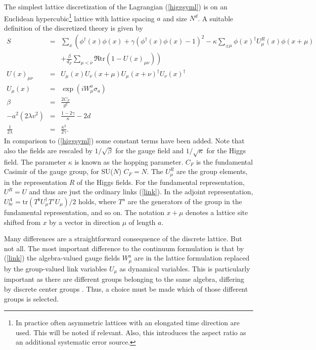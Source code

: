 \documentclass[final,twoside,12pt]{article}
\newcommand*{\no}{\noindent}
\newcommand*{\bea}{\begin{eqnarray}}
\newcommand*{\eea}{\end{eqnarray}}
\newcommand*{\pref}[1]{(\ref{#1})}
\newcommand*{\mn}{{\mu\nu}}
\newcommand*{\nn}{\nonumber}
\newcommand*{\tr}{\mathrm{tr}}
\newcommand*{\1}{1\!\!\!\bot}
\begin{document}
The simplest lattice discretization of the Lagrangian \pref{higgsyml} is on an Euclidean hypercubic\footnote{In practice often asymmetric lattices with an elongated time direction are used. This will be noted if relevant. Also, this introduces the aspect ratio as an additional systematic error source.} lattice with lattice spacing $a$ and size $N^d$. A suitable definition of the discretized theory is given by \cite{Montvay:1994cy}
\bea
S&=&\sum_x\left(\phi^\dagger(x)\phi(x)+\gamma(\phi^\dagger(x)\phi(x)-1)^2-\kappa\sum_{\pm\mu}\phi(x)^\dagger U^R_\mu(x)\phi(x+\mu)\right.\label{higgsymlat}\\
&&\left.+\frac{\beta}{d_F}\sum_{\mu<\nu}\Re\tr\left(1-U(x)_\mn\right)\right)\nn\\
U(x)_\mn&=&U_\mu(x)U_\nu(x+\mu)U_\mu(x+\nu)^\dagger U_\nu(x)^\dagger\label{plaq}\\
U_\mu(x)&=&\exp(iW_\mu^a\sigma_a)\label{link}\\
\beta&=&\frac{2C_F}{g^2}\label{beta}\\
-a^2(2\lambda v^2)&=&\frac{1-2\gamma}{\kappa}-2d\label{hopping}\\
\frac{1}{2\lambda}&=&\frac{\kappa^2}{2\gamma}\label{lambda}.
\eea
\no In comparison to \pref{higgsyml} some constant terms have been added. Note that also the fields are rescaled by $1/\sqrt{\beta}$ for the gauge field and $1/\sqrt{\kappa}$ for the Higgs field. The parameter $\kappa$ is known as the hopping parameter. $C_F$ is the fundamental Casimir of the gauge group, for SU($N$) $C_F=N$.  The $U_\mu^R$ are the group elements, in the representation $R$ of the Higgs fields. For the fundamental representation, $U^R=U$ and thus are just the ordinary links \pref{link}. In the adjoint representation, $U^A_{bc}=\tr\left(T^b U_\mu^\dagger T^c U_\mu\right)/2$ holds, where $T^a$ are the generators of the group in the fundamental representation, and so on. The notation $x+\mu$ denotes a lattice site shifted from $x$ by a vector in direction $\mu$ of length $a$.

Many differences are a straightforward consequence of the discrete lattice. But not all. The most important difference to the continuum formulation is that by \pref{link} the algebra-valued gauge fields $W_\mu^a$ are in the lattice formulation replaced by the group-valued link variables $U_\mu$ as dynamical variables. This is particularly important as there are different groups belonging to the same algebra, differing by discrete center groups \cite{O'Raifeartaigh:1986vq}. Thus, a choice must be made which of those different groups is selected.
\end{document}
